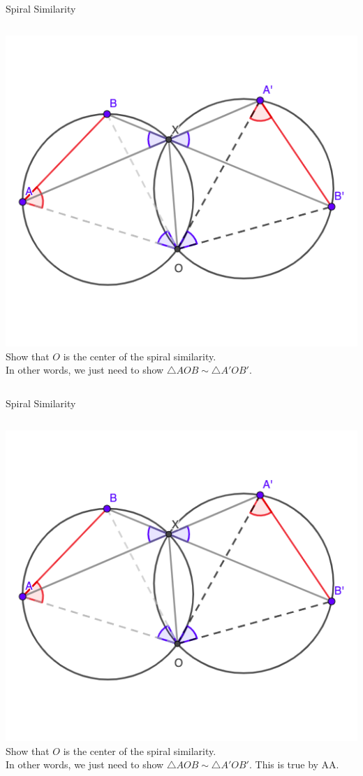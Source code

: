 \documentclass{beamer}
\begin{document}
\begin{frame}{Spiral Similarity}
	\begin{columns}
		\includegraphics[scale=0.37]{spi3.png}
		Show that $O$ is the center of the spiral similarity.\\
		\phantom{Spacing}
		In other words, we just need to show $\triangle AOB\sim
		\triangle A'OB'$.
	\end{columns}
\end{frame}
\begin{frame}{Spiral Similarity}
	\begin{columns}
		\column{0.6\textwidth}
		\includegraphics[scale=0.37]{spi3.png}
		\column{0.4\textwidth}
		Show that $O$ is the center of the spiral similarity.\\
		\phantom{Spacing}
		In other words, we just need to show $\triangle AOB\sim
		\triangle A'OB'$. This is true by AA. 
	\end{columns}
\end{frame}
\end{document}
